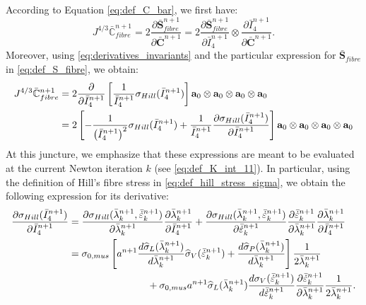 \documentclass{sfuthesis}
\numberwithin{equation}{section}
\numberwithin{figure}{chapter}
\numberwithin{table}{chapter}
\theoremstyle{definition}
\def\*#1{{\mathbf{#1}}} %
\newcommand{\pder}[2]{\dfrac{\partial #1}{\partial #2}}
\newcommand{\der}[2]{\dfrac{d #1}{d #2}}
\newcommand{\depsilon}{\dot{\varepsilon}}
\newcommand{\I}{{\bar{I}}}
\newcommand{\C}{\mathbb{C}}
\begin{document}
According to Equation \eqref{eq:def_C_bar}, we first have:
\begin{equation}
    J^{4/3} \bar{\C}_{fibre}^{n+1} = 2 \pder{\bar{\*S}_{fibre}^{n+1}}{\bar{\*C}^{n+1}} = 2 \pder{\bar{\*S}_{fibre}^{n+1}}{\I_4^{n+1}} \otimes \pder{\I_4^{n+1}}{\bar{\*C}^{n+1}}.
\end{equation}
Moreover, using \eqref{eq:derivatives_invariants} and the particular expression for $\bar{\*S}_{fibre}$ in \eqref{eq:def_S_fibre}, we obtain:
\begin{align}
    \notag J^{4/3} \bar{\C}_{fibre}^{n+1} &= 2 \pder{}{\I_4^{n+1}} \left[ \dfrac{1}{\I_4^{n+1}} \sigma_{Hill}(\I_4^{n+1})\right] \*a_0 \otimes \*a_0 \otimes \*a_0 \otimes \*a_0 \\
    &= 2 \left[ -\dfrac{1}{\left(\I_4^{n+1}\right)^2} \sigma_{Hill}(\I_4^{n+1}) + \dfrac{1}{\I_4^{n+1}} \pder{\sigma_{Hill}(\I_4^{n+1})}{\I_4^{n+1}} \right] \*a_0 \otimes \*a_0 \otimes \*a_0 \otimes \*a_0
\end{align}
At this juncture, we emphasize that these expressions are meant to be evaluated at the current Newton iteration $k$ (see \eqref{eq:def_K_int_11}). In particular, using the definition of Hill's fibre stress in \eqref{eq:def_hill_stress_sigma}, we obtain the following expression for its derivative:
\begin{align}
    \notag \pder{\sigma_{Hill}(\I_4^{n+1})}{\I_4^{n+1}} &= \pder{\sigma_{Hill}(\bar{\lambda}^{n+1}_k, \bar{\depsilon}^{n+1}_k)}{\bar{\lambda}^{n+1}_k} \pder{\bar{\lambda}^{n+1}_k}{\I_4^{n+1}} +  \pder{\sigma_{Hill}(\bar{\lambda}^{n+1}_k, \bar{\depsilon}^{n+1}_k)}{\bar{\depsilon}^{n+1}_k} \pder{\bar{\depsilon}^{n+1}_k}{\bar{\lambda}^{n+1}_k} \pder{\bar{\lambda}^{n+1}_k}{\I_4^{n+1}} \\
    \notag &= \sigma_{0,mus} \left[ a^{n+1} \der{\widehat{\sigma}_L(\bar{\lambda}^{n+1}_k)}{\bar{\lambda}^{n+1}_k} \widehat{\sigma}_V(\bar{\depsilon}^{n+1}_k) + \der{\widehat{\sigma}_P(\bar{\lambda}^{n+1}_k)}{\bar{\lambda}^{n+1}_k} \right] \dfrac{1}{2\bar{\lambda}^{n+1}_k} \\
    &\hspace{8em}+ \sigma_{0,mus} a^{n+1} \widehat{\sigma}_L(\bar{\lambda}^{n+1}_k) \der{\sigma_{V}(\bar{\depsilon}^{n+1}_k)}{\bar{\depsilon}^{n+1}_k} \pder{\bar{\depsilon}^{n+1}_k}{\bar{\lambda}^{n+1}_k} \dfrac{1}{2\bar{\lambda}^{n+1}_k}.
\end{align}
\end{document}
